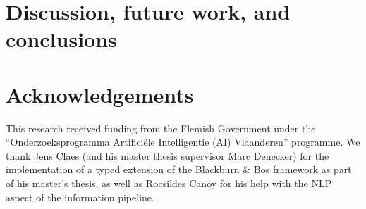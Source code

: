 \documentclass[3p]{elsarticle}
\begin{document}
\section{Discussion, future work, and conclusions}\label{sec:conclusion}










\section*{Acknowledgements}
This research received funding from the Flemish Government under the ``Onderzoeksprogramma Artifici\"ele Intelligentie (AI) Vlaanderen'' programme. 
We thank Jens Claes (and his master thesis supervisor Marc Denecker) for the implementation of a typed extension of the Blackburn \& Bos framework as part of his master's thesis, as well as Rocsildes Canoy for his help with the NLP aspect of the information pipeline. %



\end{document}
